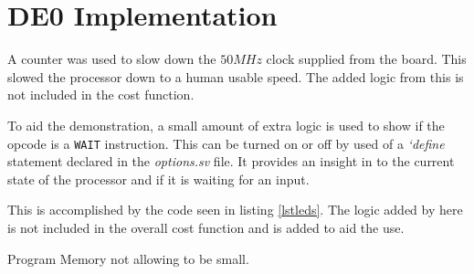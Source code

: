 
\section{DE0 Implementation}



A counter was used to slow down the $50MHz$ clock supplied from the board. 
This slowed the processor down to a human usable speed.
The added logic from this is not included in the cost function.


To aid the demonstration, a small amount of extra logic is used to show if the opcode is a \texttt{WAIT} instruction. 
This can be turned on or off by used of a \textit{`define} statement declared in the \textit{options.sv} file.
It provides an insight in to the current state of the processor and if it is waiting for an input.

This is accomplished by the code seen in listing \ref{lstleds}.
The logic added by here is not included in the overall cost function and is added to aid the use. 





Program Memory not allowing to be small. 






